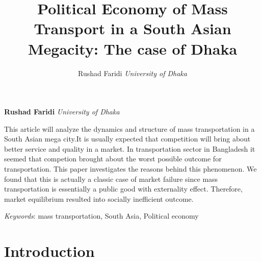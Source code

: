 \documentclass[11pt,]{article}
\title{Political Economy of Mass Transport in a South Asian Megacity: The case
of Dhaka  }
\author{\Large Rushad Faridi\vspace{0.05in} \newline\normalsize\emph{University of Dhaka}  }
\date{}
\newcommand*{\authorfont}{\fontfamily{phv}\selectfont}
\renewenvironment{abstract}
 {{%
    \setlength{\leftmargin}{0mm}
    \setlength{\rightmargin}{\leftmargin}%
  }%
  \relax}
 {\endlist}
\begin{document}
	
%

{%
\setlength{\parindent}{0pt}
\thispagestyle{plain}
{\fontsize{18}{20}\selectfont\raggedright 
\maketitle  %

}

{
   \vskip 13.5pt\relax \normalsize\fontsize{11}{12} 
\textbf{\authorfont Rushad Faridi} \hskip 15pt \emph{\small University of Dhaka}   

}

}








\begin{abstract}

    \hbox{\vrule height .2pt width 39.14pc}

    \vskip 8.5pt %

\noindent This article will analyze the dynamics and structure of mass
transportation in a South Asian mega city.It is usually expected that
competition will bring about better service and quality in a market. In
transportation sector in Bangladesh it seemed that competion brought
about the worst possible outcome for transportation. This paper
investigates the reasons behind this phenomenon. We found that this is
actually a classic case of market failure since mass transportation is
essentially a public good with externality effect. Therefore, market
equilibrium resulted into socially inefficient outcome.


\vskip 8.5pt \noindent \emph{Keywords}: mass transportation, South Asia, Political economy \par

    \hbox{\vrule height .2pt width 39.14pc}



\end{abstract}


\vskip 6.5pt


\noindent  \section{Introduction}\label{introduction}
\end{document}
